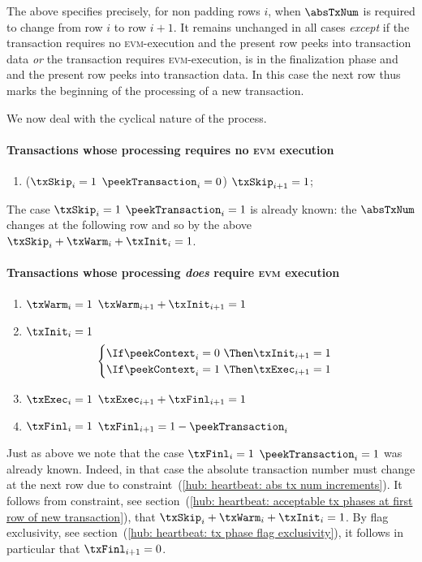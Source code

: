 The above specifies precisely, for non padding rows $i$, when $\absTxNum$ is required to change from row $i$ to row $i + 1$. It remains unchanged in all cases \emph{except} if the transaction requires no \textsc{evm}-execution and the present row peeks into transaction data \emph{or} the transaction requires \textsc{evm}-execution, is in the finalization phase and and the present row peeks into transaction data. In this case the next row thus marks the beginning of the processing of a new transaction.

We now deal with the cyclical nature of the process.

\paragraph{Transactions whose processing requires no \textsc{evm} execution}
\begin{enumerate}[resume]
	\item
		\label{hub: heartbeat: skipping phase finishes on a transaction row}
		\If \Big($\txSkip_{i} = 1$ \et $\peekTransaction_{i} = 0$\Big) \Then $\txSkip_{i + 1} = 1$;
\end{enumerate}
\saNote{} The case $\txSkip_{i} = 1$ \et $\peekTransaction_{i} = 1$ is already known: the $\absTxNum$ changes at the following row and so by the above $\locAcceptableTransactionPhaseFlagsAtFirstRowOfNewTransaction$.

\paragraph{Transactions whose processing \emph{does} require \textsc{evm} execution}
\begin{enumerate}[resume]
	\item \If $\txWarm_{i} = 1$ \Then $\txWarm_{i + 1} + \txInit_{i + 1} = 1$
	\item
		\label{hub: heartbeat: initialization phase finishes on a context row}
		\If $\txInit_{i} = 1$ \Then
		\[
			\begin{cases}
				\If \peekContext _{i} = 0 ~ \Then \txInit _{i + 1} = 1 \\
				\If \peekContext _{i} = 1 ~ \Then \txExec _{i + 1} = 1 \\
			\end{cases}
		\]
	\item \If $\txExec_{i} = 1$ \Then $\txExec_{i + 1} + \txFinl_{i + 1} = 1$
	\item
		\label{hub: heartbeat: finalization phase finishes on a transaction row}
		\If $\txFinl_{i} = 1$ \Then $\txFinl_{i + 1} = 1 - \peekTransaction_{i}$
\end{enumerate}
\saNote{}
Just as above we note that the case $\txFinl_{i} = 1$ \et $\peekTransaction_{i} = 1$ was already known.
Indeed, in that case the absolute transaction number must change at the next row due to constraint~(\ref{hub: heartbeat: abs tx num increments}).
It follows from constraint,
see section~(\ref{hub: heartbeat: acceptable tx phases at first row of new transaction}),
that $\locAcceptableTransactionPhaseFlagsAtFirstRowOfNewTransaction$.
By flag exclusivity,
see section~(\ref{hub: heartbeat: tx phase flag exclusivity}),
it follows in particular that $\txFinl_{i + 1} = 0$.

